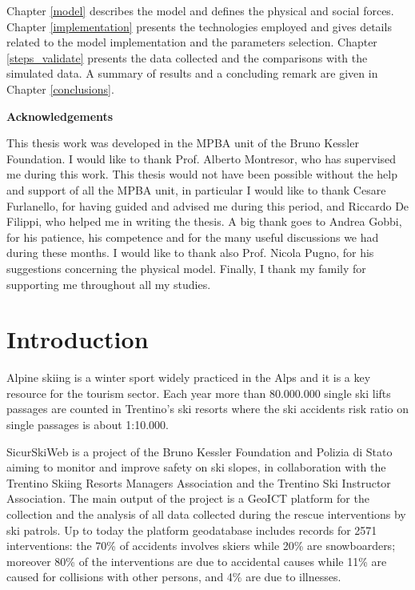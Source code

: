 \documentclass[12pt,a4paper,twoside]{book}
\makeatletter
\newcommand\ackname{Acknowledgements}
\newenvironment{acknowledgements}{%
      \titlepage
      \null\vfil
      \@beginparpenalty\@lowpenalty
      \begin{center}%
        \bfseries \ackname
        \@endparpenalty\@M
      \end{center}}%
     {\par\vfil\null\endtitlepage}
\newenvironment{acknowledgements}{%
      \if@twocolumn
        \section*{\abstractname}%
      \else
        \small
        \begin{center}%
          {\bfseries \ackname\vspace{-.5em}\vspace{\z@}}%
        \end{center}%
        \quotation
      \fi}
      {\if@twocolumn\else\endquotation\fi}
\makeatother
\begin{document}
Chapter \ref{model} describes the model and defines the physical and social forces. Chapter \ref{implementation} presents the technologies employed and gives details related to the model implementation and the parameters selection. Chapter \ref{steps_validate} presents the data collected and the comparisons with the simulated data. A summary of results and a concluding remark are given in Chapter \ref{conclusions}.

\begin{acknowledgements}
This thesis work was developed in the MPBA unit of the Bruno Kessler Foundation. I would like to thank Prof. Alberto Montresor, who has supervised me during this work. This thesis would not have been possible without the help and support of all the MPBA unit, in particular I would like to thank Cesare Furlanello, for having guided and advised me during this period, and Riccardo De Filippi, who helped me in writing the thesis. A big thank goes to Andrea Gobbi, for his patience, his competence and for the many useful discussions we had during these months. I would like to thank also Prof. Nicola Pugno, for his suggestions concerning the physical model. Finally, I thank my family for supporting me throughout all my studies.
\end{acknowledgements}

\tableofcontents

\chapter{Introduction}
Alpine skiing is a winter sport widely practiced in the Alps and it is a key resource for the tourism sector. Each year more than 80.000.000 single ski lifts passages are counted in Trentino's ski resorts where the ski accidents risk ratio on single passages is about 1:10.000.

SicurSkiWeb is a project of the Bruno Kessler Foundation and Polizia di Stato aiming to monitor and improve safety on ski slopes, in collaboration with the Trentino Skiing Resorts Managers Association and the Trentino Ski Instructor Association. The main output of the project is a GeoICT platform for the collection and the analysis of all data collected during the rescue interventions by ski patrols. Up to today the platform geodatabase includes records for 2571 interventions: the 70\% of accidents involves skiers while 20\% are snowboarders; moreover 80\% of the interventions are due to accidental causes while 11\% are caused for collisions with other persons, and 4\% are due to illnesses.
\end{document}
